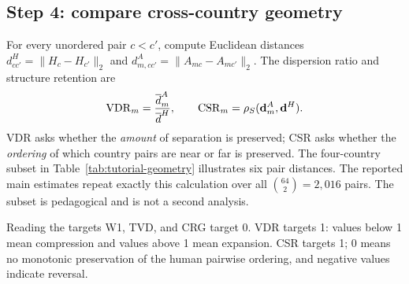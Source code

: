 \subsection{Step 4: compare cross-country geometry}
For every unordered pair $c<c'$, compute Euclidean distances
$d^H_{cc'}=\lVert H_c-H_{c'}\rVert_2$ and
$d^A_{m,cc'}=\lVert A_{mc}-A_{mc'}\rVert_2$. The dispersion ratio and structure
retention are
\[
\mathrm{VDR}_m=\frac{\overline d^A_m}{\overline d^H},
\qquad
\mathrm{CSR}_m=\rho_S(\mathbf d^A_m,\mathbf d^H).
\]
VDR asks whether the \emph{amount} of separation is preserved; CSR asks whether the
\emph{ordering} of which country pairs are near or far is preserved. The four-country
subset in Table~\ref{tab:tutorial-geometry} illustrates six pair distances. The reported
main estimates repeat exactly this calculation over all
$\binom{64}{2}=2{,}016$ pairs. The subset is pedagogical and is not a second analysis.

\begin{auditbox}{Reading the targets}
W1, TVD, and CRG target 0. VDR targets 1: values below 1 mean compression and values
above 1 mean expansion. CSR targets 1; 0 means no monotonic preservation of the human
pairwise ordering, and negative values indicate reversal.
\end{auditbox}
\FloatBarrier

